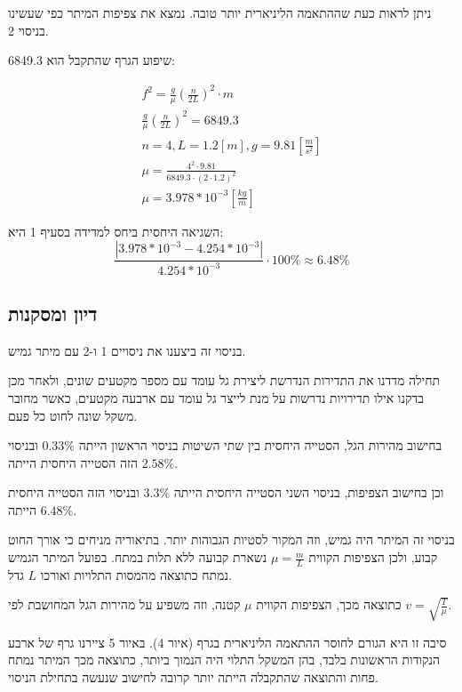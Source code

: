 \documentclass[14pt]{extarticle}
\begin{document}
ניתן לראות כעת שההתאמה הליניארית יותר טובה. נמצא את צפיפות המיתר כפי שעשינו בניסוי 2.

שיפוע הגרף שהתקבל הוא 6849.3:

\begin{center}
    \begin{equation*}
        \begin{aligned}
            f^2 = \frac{g}{\mu} (\frac{n}{2L})^2 \cdot m              \\
            \frac{g}{\mu} (\frac{n}{2L})^2 = 6849.3                   \\
            n=4, L=1.2[m], g=9.81[\frac{m}{s^2}]                      \\
            \mu = \frac{4^2 \cdot 9.81}{6849.3 \cdot (2 \cdot 1.2)^2} \\
            \mu = 3.978 * 10^{-3} [\frac{kg}{m}]
        \end{aligned}
    \end{equation*}
\end{center}

השגיאה היחסית ביחס למדידה בסעיף 1 היא:
\begin{equation*}
    \frac{|3.978 * 10^{-3} - 4.254 * 10^{-3}|}{4.254 * 10^{-3}} \cdot 100\% \approx 6.48\%
\end{equation*}

\subsection*{דיון ומסקנות}
בניסוי זה ביצענו את ניסויים 1 ו-2 עם מיתר גמיש.

תחילה מדדנו את התדירות הנדרשת ליצירת  גל עומד עם מספר מקטעים שונים, ולאחר מכן בדקנו אילו תדירויות נדרשות על מנת לייצר גל עומד עם ארבעה מקטעים, כאשר מחובר משקל שונה לחוט כל פעם.

בחישוב מהירות הגל, הסטייה היחסית בין שתי השיטות בניסוי הראשון הייתה $0.33\%$ ובניסוי הזה הסטייה היחסית הייתה $2.58\%$.

וכן בחישוב הצפיפות, בניסוי השני הסטייה היחסית הייתה $3.3\%$ ובניסוי הזה הסטייה היחסית הייתה $6.48\%$.

בניסוי זה המיתר היה גמיש, וזה המקור לסטיות הגבוהות יותר. בתיאוריה מניחים כי אורך החוט קבוע, ולכן הצפיפות הקווית $\mu=\frac{m}{L}$ נשארת קבועה ללא תלות במתח. בפועל המיתר הגמיש נמתח כתוצאה מהמסות התלויות ואורכו $L$ גדל.

כתוצאה מכך, הצפיפות הקווית $\mu$ קטנה, וזה משפיע על מהירות הגל המחושבת לפי $v=\sqrt{\frac{T}{\mu}}$.

סיבה זו היא הגורם לחוסר ההתאמה הליניארית בגרף (איור 4). באיור 5 ציירנו גרף של ארבע הנקודות הראשונות בלבד, בהן המשקל התלוי היה הנמוך ביותר, כתוצאה מכך המיתר נמתח פחות והתוצאה שהתקבלה הייתה יותר קרובה לחישוב שנעשה בתחילת הניסוי.
\end{document}
